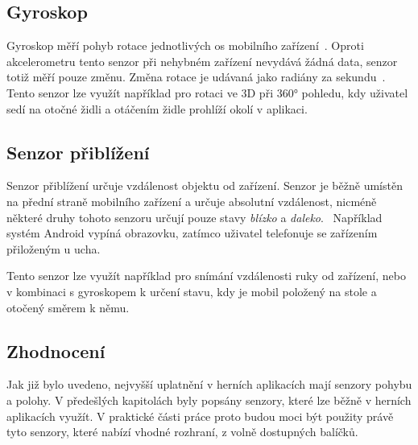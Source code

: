\subsection{Gyroskop}

Gyroskop měří pohyb rotace jednotlivých os mobilního
zařízení~\cite{sensors_motion}.
Oproti akcelerometru tento senzor při nehybném zařízení
nevydává žádná data,
senzor totiž měří pouze změnu.
Změna rotace je udávaná jako radiány za sekundu~\cite{sensors_motion}.
Tento senzor lze využít například pro rotaci ve 3D při 360° pohledu,
kdy uživatel sedí na otočné židli a otáčením židle prohlíží okolí v aplikaci.

\subsection{Senzor přiblížení}

Senzor přiblížení určuje vzdálenost objektu od zařízení.
Senzor je běžně umístěn na přední straně mobilního zařízení
a určuje absolutní vzdálenost,
nicméně některé druhy tohoto senzoru určují pouze
stavy \emph{blízko} a \emph{daleko}.~\cite{sensors_position}
Například systém Android vypíná obrazovku,
zatímco uživatel telefonuje se zařízením přiloženým u ucha.

Tento senzor lze využít například pro snímání vzdálenosti ruky od zařízení,
nebo v kombinaci s gyroskopem k určení stavu,
kdy je mobil položený na stole a otočený směrem k němu.

\subsection{Zhodnocení}

Jak již bylo uvedeno,
nejvyšší uplatnění v herních aplikacích mají senzory pohybu a polohy.
V předešlých kapitolách byly popsány senzory,
které lze běžně v herních aplikacích využít.
V praktické části práce proto budou moci být použity právě tyto senzory,
které nabízí vhodné rozhraní,
z volně dostupných balíčků.
